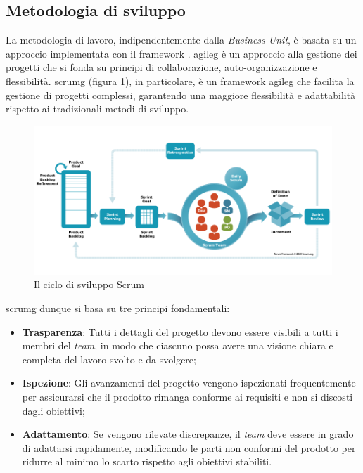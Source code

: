 \subsection{Metodologia di sviluppo}
La metodologia di lavoro, indipendentemente dalla \emph{Business Unit}, è basata su un approccio  implementata con il framework . \gls{agileg} è un approccio alla gestione dei progetti che si fonda su principi di collaborazione, auto-organizzazione e flessibilità. \gls{scrumg} (figura \ref{fig:scrum}), in particolare, è un framework \gls{agileg} che facilita la gestione di progetti complessi, garantendo una maggiore flessibilità e adattabilità rispetto ai tradizionali metodi di sviluppo.

\begin{figure}[h!]
    \centering
    \includegraphics[width=0.9\columnwidth]{img/scrum.png}
    \caption{Il ciclo di sviluppo Scrum}
    \label{fig:scrum}
\end{figure}

\gls{scrumg} dunque si basa su tre principi fondamentali:
\begin{itemize}
    \item \textbf{Trasparenza}: Tutti i dettagli del progetto devono essere visibili a tutti i membri del \emph{team}, in modo che ciascuno possa avere una visione chiara e completa del lavoro svolto e da svolgere;
    \item \textbf{Ispezione}: Gli avanzamenti del progetto vengono ispezionati frequentemente per assicurarsi che il prodotto rimanga conforme ai requisiti e non si discosti dagli obiettivi;
    \item \textbf{Adattamento}: Se vengono rilevate discrepanze, il \emph{team} deve essere in grado di adattarsi rapidamente, modificando le parti non conformi del prodotto per ridurre al minimo lo scarto rispetto agli obiettivi stabiliti.
\end{itemize}

